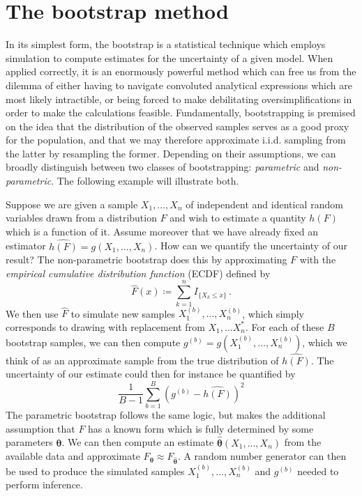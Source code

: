 \documentclass[a4paper]{book}
\theoremstyle{plain}
\begin{document}
\section{The bootstrap method} \label{sec:boot}

In its simplest form, the bootstrap is a statistical technique which employs simulation to compute estimates for the uncertainty of a given model. When applied correctly, it is an enormously powerful method which can free us from the dilemma of either having to navigate convoluted analytical expressions which are most likely intractible, or being forced to make debilitating oversimplifications in order to make the calculations feasible. Fundamentally, bootstrapping is premised on the idea that the distribution of the observed samples serves as a good proxy for the population, and that we may therefore approximate i.i.d. sampling from the latter by resampling the former. Depending on their assumptions, we can broadly distinguish  between two classes of bootstrapping: \emph{parametric} and \emph{non-parametric}. The following example will illustrate both.

Suppose we are given a sample $X_1, \dots, X_n$ of independent and identical random variables drawn from a distribution $F$ and wish to estimate a quantity $h(F)$ which is a function of it. Assume moreover that we have already fixed an estimator $\widehat{h(F)} = g(X_1, \dots, X_n)$. How can we quantify the uncertainty of our result? The non-parametric bootstrap does this by approximating $F$ with the \emph{empirical cumulative distribution function} (ECDF) defined by
\begin{equation}
    \hat{F}(x) \coloneqq \sum_{k=1}^n I_{\{ X_k \leq x \}} \,.
\end{equation}
We then use $\hat{F}$ to simulate new samples $X^{(b)}_1, \dots, X^{(b)}_n$, which simply corresponds to drawing with replacement from $X_1, \dots X^*_n$. For each of these $B$ bootstrap samples, we can then compute $g^{(b)} = g(X^{(b)}_1, \dots, X^{(b)}_n)$, which we think of as an approximate sample from the true distribution of $\widehat{h(F)}$. The uncertainty of our estimate could then for instance be quantified by
\begin{displaymath}
    \frac{1}{B-1}\sum_{b=1}^B(g^{(b)} - \widehat{h(F)})^2
\end{displaymath}
The parametric bootstrap follows the same logic, but makes the additional assumption that $F$ has a known form which is fully determined by some parameters $\boldsymbol{\theta}$. We can then compute an estimate $\boldsymbol{\hat{\theta}}(X_1, \dots, X_n)$ from the available data and approximate $F_{\boldsymbol{\theta}} \approx F_{\boldsymbol{\hat{\theta}}}$. A random number generator can then be used to produce the simulated samples $X^{(b)}_1, \dots, X^{(b)}_n$ and $g^{(b)}$ needed to perform inference.
\end{document}

